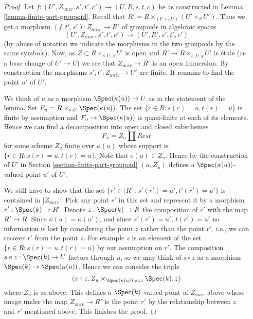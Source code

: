 \begin{proof}
Let $f : (U', Z_{univ}, s', t', c') \to (U, R, s, t, c)$ be as constructed in
Lemma \ref{lemma-finite-part-groupoid}.
Recall that $R' = R \times_{(U \times_S U)} (U' \times_S U')$.
Thus we get a morphism $(f, t', s') : Z_{univ} \to R'$ of groupoids
in algebraic spaces
$$
(U', Z_{univ}, s', t', c') \to (U', R', s', t', c')
$$
(by abuse of notation we indicate the morphisms in the two groupoids
by the same symbols). Now, as $Z \subset R \times_{s, U, g} U'$ is open
and $R' \to R \times_{s, U, g} U'$ is \'etale (as a base change
of $U' \to U$) we see that $Z_{univ} \to R'$ is an open immersion.
By construction the morphisms $s', t' : Z_{univ} \to U'$ are finite.
It remains to find the point $u'$ of $U'$.

\medskip\noindent
We think of $u$ as a morphism $\Spec(\kappa(u)) \to U$ as in
the statement of the lemma. Set $F_u = R \times_{s, U} \Spec(\kappa(u))$.
The set $\{r \in R : s(r) = u, t(r) = u\}$ is finite by assumption
and $F_u \to \Spec(\kappa(u))$ is quasi-finite at each
of its elements. Hence we can find a decomposition into open and closed
subschemes
$$
F_u = Z_u \amalg Rest
$$
for some scheme $Z_u$ finite over $\kappa(u)$ whose support is
$\{r \in R : s(r) = u, t(r) = u\}$. Note that $e(u) \in Z_u$.
Hence by the construction of $U'$ in
Section \ref{section-finite-part-groupoid}
$(u, Z_u)$ defines a $\Spec(\kappa(u))$-valued
point $u'$ of $U'$.

\medskip\noindent
We still have to show that the set
$\{r' \in |R'| : s'(r') = u', t'(r') = u'\}$
is contained in $|Z_{univ}|$.
Pick any point $r'$ in this set and represent it by a morphism
$r' : \Spec(k) \to R'$. Denote $z : \Spec(k) \to R$
the composition of $r'$ with the map $R' \to R$.
Since $\kappa(u) = \kappa(u')$, and since $s'(r') = u'$, $t(r') = u'$
no information is lost by considering the point $z$ rather than the
point $r'$, i.e., we can recover $r'$ from the point $z$.
For example $z$ is an element of the set $\{r \in R : s(r) = u, t(r) = u\}$
by our assumption on $r'$. The composition
$s \circ z : \Spec(k) \to U$ factors through $u$, so we may
think of $s \circ z$ as a morphism $\Spec(k) \to \Spec(\kappa(u))$.
Hence we can consider the triple
$$
(s \circ z, Z_u \times_{\Spec(\kappa(u)), s \circ z} \Spec(k), z)
$$
where $Z_u$ is as above. This defines a $\Spec(k)$-valued point
of $Z_{univ}$ above whose image under the map $Z_{univ} \to R'$
is the point $r'$ by the relationship between $z$ and $r'$ mentioned
above. This finishes the proof.
\end{proof}


